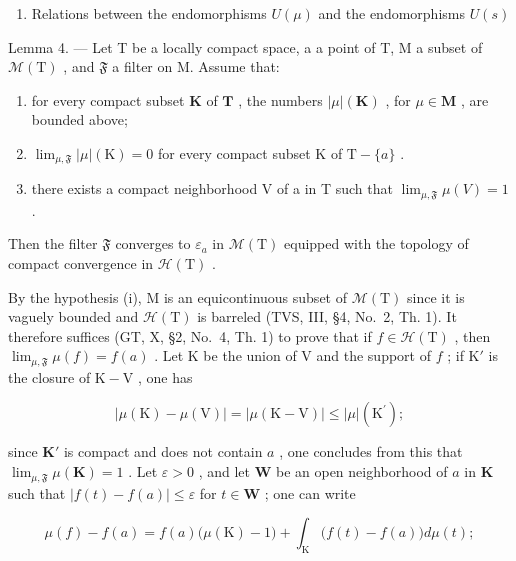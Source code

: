 \begin{enumerate}
\def\labelenumi{\arabic{enumi}.}
\setcounter{enumi}{6}
\tightlist
\item
  Relations between the endomorphisms \(U(\mu)\) and the endomorphisms \(U(s)\)
\end{enumerate}

Lemma 4. --- Let T be a locally compact space, a a point of T, M a subset of \(\mathcal{M}(\mathrm{T})\) , and \(\mathfrak{F}\) a filter on M. Assume that:

\begin{enumerate}
\def\labelenumi{(\roman{enumi})}
\item
  for every compact subset \(\mathbf{K}\) of \(\mathbf{T}\) , the numbers \(|\mu|(\mathbf{K})\) , for \(\mu \in \mathbf{M}\) , are bounded above;
\item
  \(\lim_{\mu, \mathfrak{F}} |\mu| (\mathrm{K}) = 0\) for every compact subset \(\mathrm{K}\) of \(\mathrm{T} - \{a\}\) .
\item
  there exists a compact neighborhood V of a in T such that \(\lim_{\mu, \mathfrak{F}} \mu(V) = 1\) .
\end{enumerate}

Then the filter \(\mathfrak{F}\) converges to \(\varepsilon_{a}\) in \(\mathcal{M}(\mathrm{T})\) equipped with the topology of compact convergence in \(\mathcal{H}(\mathrm{T})\) .

By the hypothesis (i), M is an equicontinuous subset of \(\mathcal{M}(\mathrm{T})\) since it is vaguely bounded and \(\mathcal{H}(\mathrm{T})\) is barreled (TVS, III, §4, No.~2, Th. 1). It therefore suffices (GT, X, §2, No.~4, Th. 1) to prove that if \(f \in \mathcal{H}(\mathrm{T})\) , then \(\lim_{\mu, \mathfrak{F}} \mu(f) = f(a)\) . Let K be the union of V and the support of \(f\) ; if \(\mathrm{K}'\) is the closure of \(\mathrm{K} - \mathrm{V}\) , one has

\[
| \mu (\mathrm{K}) - \mu (\mathrm{V}) | = | \mu (\mathrm{K} - \mathrm{V}) | \leqslant | \mu | (\mathrm{K} ^ {\prime});
\]

since \(\mathbf{K}'\) is compact and does not contain \(a\) , one concludes from this that \(\lim_{\mu, \mathfrak{F}} \mu(\mathbf{K}) = 1\) . Let \(\varepsilon > 0\) , and let \(\mathbf{W}\) be an open neighborhood of \(a\) in \(\mathbf{K}\) such that \(|f(t) - f(a)| \leqslant \varepsilon\) for \(t \in \mathbf{W}\) ; one can write

\[
\mu (f) - f (a) = f (a) \big (\mu (\mathrm{K}) - 1 \big) + \int_ {\mathrm{K}} \big (f (t) - f (a) \big) d \mu (t);
\]

